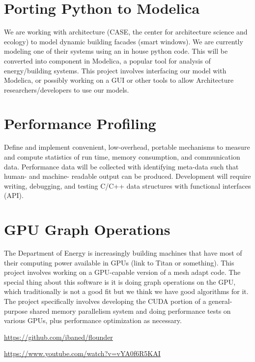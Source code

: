 \documentclass[12pt]{article}
\begin{document}
\section{Porting Python to Modelica} 
We are working with architecture (CASE, the center for architecture science and
ecology) to model dynamic building facades (smart windows). We are currently
modeling one of their systems using an in house python code. This will be
converted into  component in Modelica, a popular tool for analysis of
energy/building systems. This project involves interfacing our model with
Modelica, or possibly working on a GUI or other tools to allow Architecture
researchers/developers to use our models.

\section{Performance Profiling}
Define and implement convenient, low-overhead, portable mechanisms to measure
and compute statistics of run time, memory consumption, and communication data.
Performance data will be collected with identifying meta-data such that human-
and machine- readable output can be produced.  Development will require
writing, debugging, and testing C/C++ data structures with functional
interfaces (API).

\section{GPU Graph Operations}
The Department of Energy is increasingly building machines that have most of
their computing power available in GPUs (link to Titan or something). This
project involves working on a GPU-capable version of a mesh adapt
code. The special thing about this software is it is doing graph operations on
the GPU, which traditionally is not a good fit but we think we have good
algorithms for it. The project specifically involves developing the CUDA
portion of a general-purpose shared memory parallelism system and doing
performance tests on various GPUs, plus performance optimization as necessary.

\url{https://github.com/ibaned/flounder}

\url{https://www.youtube.com/watch?v=vYA0f6R5KAI}
\end{document}
